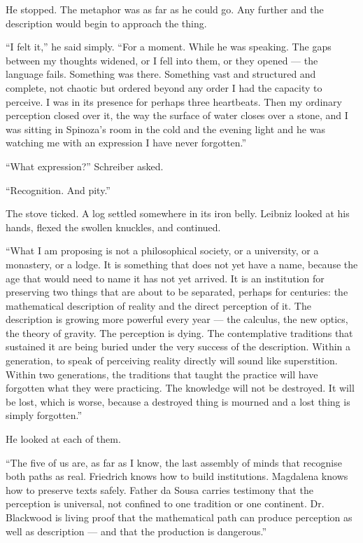 He stopped. The metaphor was as far as he could go. Any further and the description would begin to approach the thing.

``I felt it,'' he said simply. ``For a moment. While he was speaking. The gaps between my thoughts widened, or I fell into them, or they opened --- the language fails. Something was there. Something vast and structured and complete, not chaotic but ordered beyond any order I had the capacity to perceive. I was in its presence for perhaps three heartbeats. Then my ordinary perception closed over it, the way the surface of water closes over a stone, and I was sitting in Spinoza's room in the cold and the evening light and he was watching me with an expression I have never forgotten.''

``What expression?'' Schreiber asked.

``Recognition. And pity.''

\scenebreak

The stove ticked. A log settled somewhere in its iron belly. Leibniz looked at his hands, flexed the swollen knuckles, and continued.

``What I am proposing is not a philosophical society, or a university, or a monastery, or a lodge. It is something that does not yet have a name, because the age that would need to name it has not yet arrived. It is an institution for preserving two things that are about to be separated, perhaps for centuries: the mathematical description of reality and the direct perception of it. The description is growing more powerful every year --- the calculus, the new optics, the theory of gravity. The perception is dying. The contemplative traditions that sustained it are being buried under the very success of the description. Within a generation, to speak of perceiving reality directly will sound like superstition. Within two generations, the traditions that taught the practice will have forgotten what they were practicing. The knowledge will not be destroyed. It will be lost, which is worse, because a destroyed thing is mourned and a lost thing is simply forgotten.''

He looked at each of them.

``The five of us are, as far as I know, the last assembly of minds that recognise both paths as real. Friedrich knows how to build institutions. Magdalena knows how to preserve texts safely. Father da Sousa carries testimony that the perception is universal, not confined to one tradition or one continent. Dr. Blackwood is living proof that the mathematical path can produce perception as well as description --- and that the production is dangerous.''

